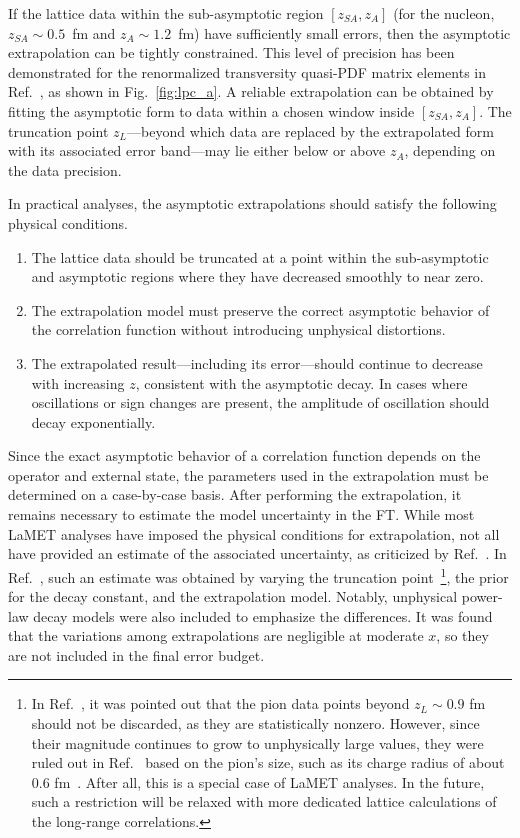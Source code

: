 \documentclass[prd,twocolumn,superscriptaddress,preprintnumbers,showpacs,nofootinbib,notitlepage,floatfix]{revtex4-2}
\DeclareRobustCommand{\fig}[1]{Fig.~\ref{fig:#1}}
\begin{document}
If the lattice data within the sub-asymptotic region $[z_{SA}, z_A]$ (for the nucleon, $z_{SA} \sim 0.5$~fm and $z_A \sim 1.2$~fm) have sufficiently small errors, then the asymptotic extrapolation can be tightly constrained. This level of precision has been demonstrated for the renormalized transversity quasi-PDF matrix elements in Ref.~\cite{LatticeParton:2022xsd}, as shown in \fig{lpc_a}. A reliable extrapolation can be obtained by fitting the asymptotic form to data within a chosen window inside $[z_{SA}, z_A]$. The truncation point $z_L$---beyond which data are replaced by the extrapolated form with its associated error band---may lie either below or above $z_A$, depending on the data precision.

In practical analyses, the asymptotic extrapolations should satisfy the following physical conditions. 
\begin{enumerate}
    \item The lattice data should be truncated at a point within the sub-asymptotic and asymptotic regions where they have decreased smoothly to near zero.
    \item The extrapolation model must preserve the correct asymptotic behavior of the correlation function without introducing unphysical distortions.
    \item The extrapolated result---including its error---should continue to decrease with increasing $z$, consistent with the asymptotic decay. In cases where oscillations or sign changes are present, the amplitude of oscillation should decay exponentially.
\end{enumerate}
Since the exact asymptotic behavior of a correlation function depends on the operator and external state, the parameters used in the extrapolation must be determined on a case-by-case basis. After performing the extrapolation, it remains necessary to estimate the model uncertainty in the FT. While most LaMET analyses have imposed the physical conditions for extrapolation, not all have provided an estimate of the associated uncertainty, as criticized by Ref.~\cite{Dutrieux:2025jed}. In Ref.~\cite{Gao:2021dbh}, such an estimate was obtained by varying the truncation point~\footnote{In Ref.~\cite{Dutrieux:2025axb}, it was pointed out that the pion data points beyond $z_L \sim 0.9$ fm should not be discarded, as they are statistically nonzero. However, since their magnitude continues to grow to unphysically large values, they were ruled out in Ref.~\cite{Gao:2021dbh} based on the pion's size, such as its charge radius of about $0.6$ fm~\cite{Gao:2021xsm}. After all, this is a special case of LaMET analyses. In the future, such a restriction will be relaxed with more dedicated lattice calculations of the long-range correlations.}, the prior for the decay constant, and the extrapolation model. Notably, unphysical power-law decay models were also included to emphasize the differences. It was found that the variations among extrapolations are negligible at moderate $x$, so they are not included in the final error budget.
\end{document}
